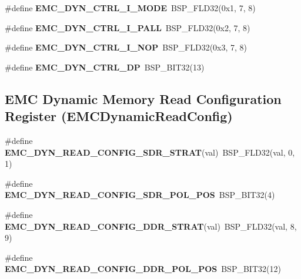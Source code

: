 \begin{DoxyCompactItemize}
\mbox{\label{group__lpc__emc_gae735d422a3158ff8a573e244adc4ec46}} 
\#define {\bfseries E\+M\+C\+\_\+\+D\+Y\+N\+\_\+\+C\+T\+R\+L\+\_\+\+I\+\_\+\+M\+O\+DE}~B\+S\+P\+\_\+\+F\+L\+D32(0x1, 7, 8)
\item 
\mbox{\label{group__lpc__emc_ga5155477f9cf377840619304c918b413c}} 
\#define {\bfseries E\+M\+C\+\_\+\+D\+Y\+N\+\_\+\+C\+T\+R\+L\+\_\+\+I\+\_\+\+P\+A\+LL}~B\+S\+P\+\_\+\+F\+L\+D32(0x2, 7, 8)
\item 
\mbox{\label{group__lpc__emc_ga894f78d8908d3611adfa7677ed25d97c}} 
\#define {\bfseries E\+M\+C\+\_\+\+D\+Y\+N\+\_\+\+C\+T\+R\+L\+\_\+\+I\+\_\+\+N\+OP}~B\+S\+P\+\_\+\+F\+L\+D32(0x3, 7, 8)
\item 
\mbox{\label{group__lpc__emc_ga1c7f67f8ffca65b09510cffb4edcb77a}} 
\#define {\bfseries E\+M\+C\+\_\+\+D\+Y\+N\+\_\+\+C\+T\+R\+L\+\_\+\+DP}~B\+S\+P\+\_\+\+B\+I\+T32(13)
\end{DoxyCompactItemize}
\subsection*{E\+MC Dynamic Memory Read Configuration Register (E\+M\+C\+Dynamic\+Read\+Config)}
\begin{DoxyCompactItemize}
\item 
\mbox{\label{group__lpc__emc_ga91725061feec5f0c4088c2ef61f22cec}} 
\#define {\bfseries E\+M\+C\+\_\+\+D\+Y\+N\+\_\+\+R\+E\+A\+D\+\_\+\+C\+O\+N\+F\+I\+G\+\_\+\+S\+D\+R\+\_\+\+S\+T\+R\+AT}(val)~B\+S\+P\+\_\+\+F\+L\+D32(val, 0, 1)
\item 
\mbox{\label{group__lpc__emc_gabf673f90fffeb8b012532626b6ebfaad}} 
\#define {\bfseries E\+M\+C\+\_\+\+D\+Y\+N\+\_\+\+R\+E\+A\+D\+\_\+\+C\+O\+N\+F\+I\+G\+\_\+\+S\+D\+R\+\_\+\+P\+O\+L\+\_\+\+P\+OS}~B\+S\+P\+\_\+\+B\+I\+T32(4)
\item 
\mbox{\label{group__lpc__emc_ga76ed0fdddf09bb097eccb427abb4b497}} 
\#define {\bfseries E\+M\+C\+\_\+\+D\+Y\+N\+\_\+\+R\+E\+A\+D\+\_\+\+C\+O\+N\+F\+I\+G\+\_\+\+D\+D\+R\+\_\+\+S\+T\+R\+AT}(val)~B\+S\+P\+\_\+\+F\+L\+D32(val, 8, 9)
\item 
\mbox{\label{group__lpc__emc_gabc63f32f5a2e682f609a51ccd25ef230}} 
\#define {\bfseries E\+M\+C\+\_\+\+D\+Y\+N\+\_\+\+R\+E\+A\+D\+\_\+\+C\+O\+N\+F\+I\+G\+\_\+\+D\+D\+R\+\_\+\+P\+O\+L\+\_\+\+P\+OS}~B\+S\+P\+\_\+\+B\+I\+T32(12)
\end{DoxyCompactItemize}

